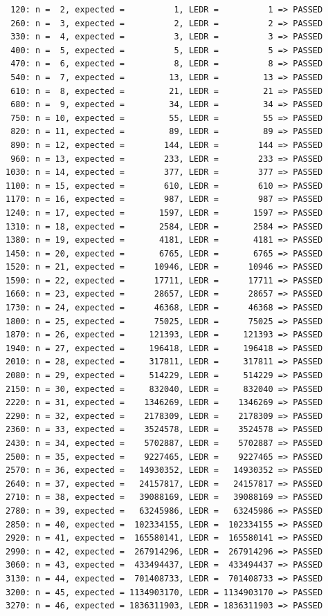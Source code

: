 \documentclass[12pt,a4paper,oneside]{book} %
\begin{document}
\begin{verbatim}
 120: n =  2, expected =          1, LEDR =          1 => PASSED
 260: n =  3, expected =          2, LEDR =          2 => PASSED
 330: n =  4, expected =          3, LEDR =          3 => PASSED
 400: n =  5, expected =          5, LEDR =          5 => PASSED
 470: n =  6, expected =          8, LEDR =          8 => PASSED
 540: n =  7, expected =         13, LEDR =         13 => PASSED
 610: n =  8, expected =         21, LEDR =         21 => PASSED
 680: n =  9, expected =         34, LEDR =         34 => PASSED
 750: n = 10, expected =         55, LEDR =         55 => PASSED
 820: n = 11, expected =         89, LEDR =         89 => PASSED
 890: n = 12, expected =        144, LEDR =        144 => PASSED
 960: n = 13, expected =        233, LEDR =        233 => PASSED
1030: n = 14, expected =        377, LEDR =        377 => PASSED
1100: n = 15, expected =        610, LEDR =        610 => PASSED
1170: n = 16, expected =        987, LEDR =        987 => PASSED
1240: n = 17, expected =       1597, LEDR =       1597 => PASSED
1310: n = 18, expected =       2584, LEDR =       2584 => PASSED
1380: n = 19, expected =       4181, LEDR =       4181 => PASSED
1450: n = 20, expected =       6765, LEDR =       6765 => PASSED
1520: n = 21, expected =      10946, LEDR =      10946 => PASSED
1590: n = 22, expected =      17711, LEDR =      17711 => PASSED
1660: n = 23, expected =      28657, LEDR =      28657 => PASSED
1730: n = 24, expected =      46368, LEDR =      46368 => PASSED
1800: n = 25, expected =      75025, LEDR =      75025 => PASSED
1870: n = 26, expected =     121393, LEDR =     121393 => PASSED
1940: n = 27, expected =     196418, LEDR =     196418 => PASSED
2010: n = 28, expected =     317811, LEDR =     317811 => PASSED
2080: n = 29, expected =     514229, LEDR =     514229 => PASSED
2150: n = 30, expected =     832040, LEDR =     832040 => PASSED
2220: n = 31, expected =    1346269, LEDR =    1346269 => PASSED
2290: n = 32, expected =    2178309, LEDR =    2178309 => PASSED
2360: n = 33, expected =    3524578, LEDR =    3524578 => PASSED
2430: n = 34, expected =    5702887, LEDR =    5702887 => PASSED
2500: n = 35, expected =    9227465, LEDR =    9227465 => PASSED
2570: n = 36, expected =   14930352, LEDR =   14930352 => PASSED
2640: n = 37, expected =   24157817, LEDR =   24157817 => PASSED
2710: n = 38, expected =   39088169, LEDR =   39088169 => PASSED
2780: n = 39, expected =   63245986, LEDR =   63245986 => PASSED
2850: n = 40, expected =  102334155, LEDR =  102334155 => PASSED
2920: n = 41, expected =  165580141, LEDR =  165580141 => PASSED
2990: n = 42, expected =  267914296, LEDR =  267914296 => PASSED
3060: n = 43, expected =  433494437, LEDR =  433494437 => PASSED
3130: n = 44, expected =  701408733, LEDR =  701408733 => PASSED
3200: n = 45, expected = 1134903170, LEDR = 1134903170 => PASSED
3270: n = 46, expected = 1836311903, LEDR = 1836311903 => PASSED
\end{verbatim}
\end{document}
